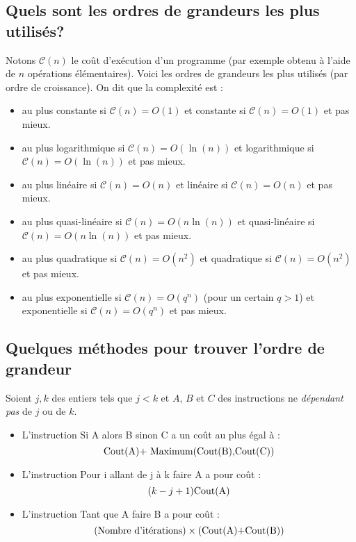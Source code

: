\documentclass[french,11pt,twoside]{VcCours}
\begin{document}
\subsection{Quels sont les ordres de grandeurs les plus utilisés?}

Notons $\mathcal{C}(n)$ le coût d'exécution d'un programme (par exemple obtenu à l'aide de $n$ opérations élémentaires).  Voici les ordres de grandeurs les plus utilisés (par ordre de croissance). On dit que la complexité est :

\begin{itemize}
\item au plus constante si $\mathcal{C}(n)=O(1)$ et constante si $\mathcal{C}(n)=O(1)$ et pas mieux.
\item au plus logarithmique si $\mathcal{C}(n)=O(\ln(n))$ et logarithmique si $\mathcal{C}(n)=O(\ln(n))$ et pas mieux.
\item au plus linéaire si $\mathcal{C}(n)=O(n)$ et linéaire si $\mathcal{C}(n)=O(n)$ et pas mieux.
\item au plus quasi-linéaire si $\mathcal{C}(n)=O(n\ln(n))$ et quasi-linéaire si $\mathcal{C}(n)=O(n\ln(n))$ et pas mieux.
\item au plus quadratique si $\mathcal{C}(n)=O(n^2)$ et quadratique si $\mathcal{C}(n)=O(n^2)$ et pas mieux.
\item au plus exponentielle si $\mathcal{C}(n)=O(q^n)$ (pour un certain $q>1$) et exponentielle si $\mathcal{C}(n)=O(q^n)$ et pas mieux.
\end{itemize}

\subsection{Quelques méthodes pour trouver l'ordre de grandeur}
Soient $j,k$ des entiers tels que $j<k$ et $A$, $B$ et $C$ des instructions ne \emph{dépendant pas} de $j$ ou de $k$.

\begin{itemize}
\item L'instruction \og Si A alors B sinon C \fg{} a un coût au plus égal à :
$$ \hbox{Cout(A)+ Maximum(Cout(B),Cout(C))}$$
\item L'instruction \og Pour i allant de j à k faire A \fg{} a pour coût :
$$ (k-j+1)\hbox{Cout(A)}$$
\item  L'instruction \og Tant que A faire B \fg{} a pour coût :
$$ \hbox{(Nombre d'itérations)} \times \hbox{(Cout(A)+Cout(B))}$$
\end{itemize}
\end{document}
